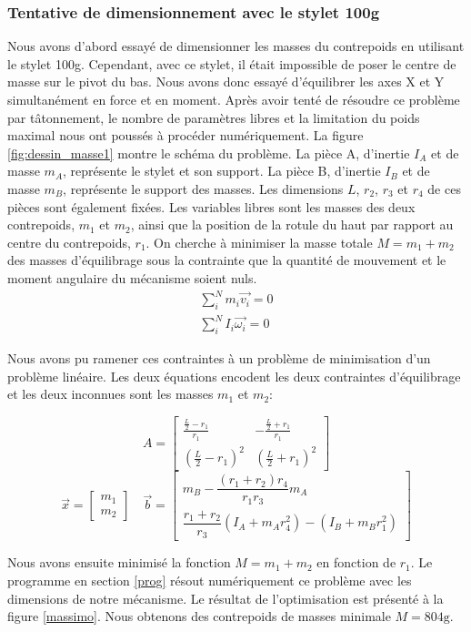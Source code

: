 \documentclass[a4paper, 11pt]{article} %
\begin{document}
\newpage

\subsubsection*{Tentative de dimensionnement avec le stylet 100g}
\noindent
\begin{minipage}[t]{0.65\textwidth}
Nous avons d'abord essayé de dimensionner les masses du contrepoids en utilisant le stylet 100g. Cependant, avec ce stylet, il était impossible de poser le centre de masse sur le pivot du bas. Nous avons donc essayé d'équilibrer les axes X et Y simultanément en force et en moment. Après avoir tenté de résoudre ce problème par tâtonnement, le nombre de paramètres libres et la limitation du poids maximal nous ont poussés à procéder numériquement. La figure \ref{fig:dessin_masse1} montre le schéma du problème. La pièce A, d'inertie $I_A$ et de masse $m_A$, représente le stylet et son support. La pièce B, d'inertie $I_B$ et de masse $m_B$, représente le support des masses. Les dimensions $L$, $r_2$, $r_3$ et $r_4$ de ces pièces sont également fixées. Les variables libres sont les masses des deux contrepoids, $m_1$ et $m_2$, ainsi que la position de la rotule du haut par rapport au centre du contrepoids, $r_1$. On cherche à minimiser la masse totale $M = m_1 + m_2$ des masses d'équilibrage sous la contrainte que la quantité de mouvement et le moment angulaire du mécanisme soient nuls. 
\begin{gather*}
\sum_i^N m_i \vec{v_i} = 0 \\
\sum_i^N I_i \vec{\omega_i} = 0 
\end{gather*}

Nous avons pu ramener ces contraintes à un problème de minimisation d'un problème linéaire. Les deux équations encodent les deux contraintes d'équilibrage et les deux inconnues sont les masses $m_1$ et $m_2$:

\vspace{1em}

$$
A =
\begin{bmatrix}
\frac{\frac{L}{2} - r_1}{r_1} & -\frac{\frac{L}{2} + r_1}{r_1} \\
\left( \frac{L}{2} - r_1 \right)^2 & \left( \frac{L}{2} + r_1 \right)^2
\end{bmatrix}
$$
$$
\vec{x} = 
\begin{bmatrix}
m_1 \\
m_2
\end{bmatrix}
\quad
\vec{b}=
\begin{bmatrix}
m_B - \dfrac{(r_1 + r_2)r_4}{r_1 r_3} m_A \\
\dfrac{r_1 + r_2}{r_3}(I_A + m_A r_4^2) - (I_B + m_B r_1^2)
\end{bmatrix}
$$

\vspace{1em}

Nous avons ensuite minimisé la fonction $M = m_1 + m_2$ en fonction de $r_1$. Le programme en section \ref{prog} résout numériquement ce problème avec les dimensions de notre mécanisme. Le résultat de l'optimisation est présenté à la figure \ref{massimo}. Nous obtenons des contrepoids de masses minimale $M = 804\text{g}$. 
\end{minipage}
\end{document}
